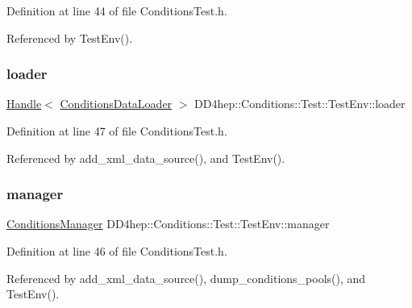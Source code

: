 Definition at line 44 of file Conditions\+Test.\+h.



Referenced by Test\+Env().

\hypertarget{struct_d_d4hep_1_1_conditions_1_1_test_1_1_test_env_acf0847e9018a0793ef805d2a16b033a5}{}\label{struct_d_d4hep_1_1_conditions_1_1_test_1_1_test_env_acf0847e9018a0793ef805d2a16b033a5} 
\subsubsection{\texorpdfstring{loader}{loader}}
{\footnotesize\ttfamily \hyperlink{class_d_d4hep_1_1_handle}{Handle}$<$ \hyperlink{class_d_d4hep_1_1_conditions_1_1_conditions_data_loader}{Conditions\+Data\+Loader} $>$ D\+D4hep\+::\+Conditions\+::\+Test\+::\+Test\+Env\+::loader}



Definition at line 47 of file Conditions\+Test.\+h.



Referenced by add\+\_\+xml\+\_\+data\+\_\+source(), and Test\+Env().

\hypertarget{struct_d_d4hep_1_1_conditions_1_1_test_1_1_test_env_aadbe3c1f12fe6972edbf18f58359a107}{}\label{struct_d_d4hep_1_1_conditions_1_1_test_1_1_test_env_aadbe3c1f12fe6972edbf18f58359a107} 
\subsubsection{\texorpdfstring{manager}{manager}}
{\footnotesize\ttfamily \hyperlink{class_d_d4hep_1_1_conditions_1_1_conditions_manager}{Conditions\+Manager} D\+D4hep\+::\+Conditions\+::\+Test\+::\+Test\+Env\+::manager}



Definition at line 46 of file Conditions\+Test.\+h.



Referenced by add\+\_\+xml\+\_\+data\+\_\+source(), dump\+\_\+conditions\+\_\+pools(), and Test\+Env().


